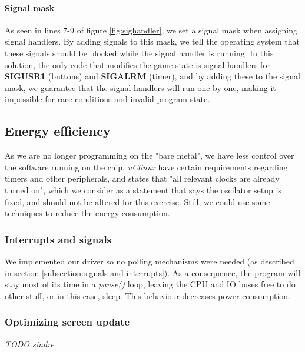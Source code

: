 \paragraph{Signal mask}
As seen in lines 7-9 of figure \ref{fig:sighandler}, we set a signal mask when assigning signal handlers. By adding signals to this mask, we tell the operating system that these signals should be blocked while the signal handler is running. In this solution, the only code that modifies the game state is signal handlers for \textbf{SIGUSR1} (buttons) and \textbf{SIGALRM} (timer), and by adding these to the signal mask, we guarantee that the signal handlers will run one by one, making it impossible for race conditions and invalid program state.


\subsection{Energy efficiency}
\label{subsection:energy-efficiency}
As we are no longer programming on the "bare metal", we have less control over the software running on the chip. \emph{uClinux} have certain requirements regarding timers and other peripherals, and \cite{compendium} states that "all relevant clocks are already turned on", which we consider as a statement that says the oscilator setup is fixed, and should not be altered for this exercise. Still, we could use some techniques to reduce the energy consumption.

\subsubsection{Interrupts and signals}
We implemented our driver so no polling mechanisms were needed (as described in section \ref{subsection:signals-and-interrupts}). As a consequence, the program will stay most of its time in a \emph{pause()} loop, leaving the CPU and IO buses free to do other stuff, or in this case, sleep. This behaviour decreases power consumption.

\subsubsection{Optimizing screen update}
\emph{TODO sindre}

